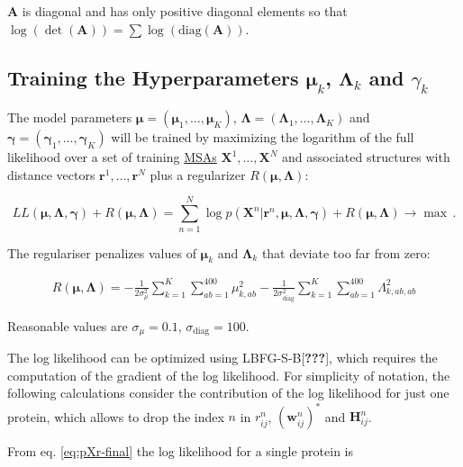 \documentclass[12pt,a4paper,twoside]{book}
\renewcommand{\H}{\mathbf{H}}
\newcommand{\Hij}{\H_{ij}}
\newcommand{\Lk}{\mathbf{\Lambda}_k}
\newcommand{\muk}{\mathbf{\mu}_k}
\renewcommand{\r}{\mathbf{r}}
\newcommand{\rij}{r_{ij}}
\newcommand{\wij}{\mathbf{w}_{ij}}
\newcommand{\X}{\mathbf{X}}
\theoremstyle{definition}
\theoremstyle{definition}
\theoremstyle{remark}
\begin{document}
\(\mathbf{A}\) is diagonal and has only positive diagonal elements so
that
\(\log(\det(\mathbf{A})) = \sum \log \left( \text{diag}(\mathbf{A}) \right)\).

\subsection{\texorpdfstring{Training the Hyperparameters \(\muk\),
\(\Lk\) and
\(\gamma_k\)}{Training the Hyperparameters \textbackslash{}muk, \textbackslash{}Lk and \textbackslash{}gamma\_k}}\label{training-hyperparameters}

The model parameters
\(\mathbf{\mu} = (\mathbf{\mu}_{1},\ldots,\mathbf{\mu}_K)\),
\(\mathbf{\Lambda} = (\mathbf{\Lambda}_1,\ldots,\mathbf{\Lambda}_K)\)
and \(\mathbf{\gamma} = (\mathbf{\gamma}_1,\ldots,\mathbf{\gamma}_K)\)
will be trained by maximizing the logarithm of the full likelihood over
a set of training \protect\hyperlink{abbrev}{MSAs} \(\X^1,\ldots,\X^N\)
and associated structures with distance vectors \(\r^1,\ldots,\r^N\)
plus a regularizer \(R(\mathbf{\mu}, \mathbf{\Lambda})\):

\begin{equation}
    L\!L(\mathbf{\mu}, \mathbf{\Lambda}, \mathbf{\gamma}) + R(\mathbf{\mu}, \mathbf{\Lambda}) = \sum_{n=1}^N  \log p(\X^n | \r^n, \mathbf{\mu}, \mathbf{\Lambda}, \mathbf{\gamma} ) + R(\mathbf{\mu}, \mathbf{\Lambda})  \rightarrow \max \, .
\end{equation}

The regulariser penalizes values of \(\muk\) and \(\Lk\) that deviate
too far from zero:

\begin{align}
    R(\mathbf{\mu}, \mathbf{\Lambda}) = -\frac{1}{2 \sigma_{\mu}^2} \sum_{k=1}^K \sum_{ab=1}^{400} \mu_{k,ab}^2 
                        -\frac{1}{2 \sigma_\text{diag}^2} \sum_{k=1}^K \sum_{ab=1}^{400} \Lambda_{k,ab,ab}^2
\label{eq:reg}
\end{align}

Reasonable values are \(\sigma_{\mu}=0.1\),
\(\sigma_\text{diag} = 100\).

The log likelihood can be optimized using LBFG-S-B{[}{\textbf{???}}{]},
which requires the computation of the gradient of the log likelihood.
For simplicity of notation, the following calculations consider the
contribution of the log likelihood for just one protein, which allows to
drop the index \(n\) in \(\rij^n\), \((\wij^n)^*\) and \(\Hij^n\).

From eq. \eqref{eq:pXr-final} the log likelihood for a single protein is
\end{document}
